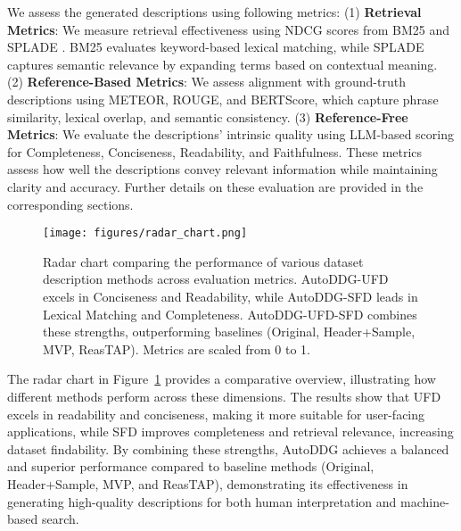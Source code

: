 % 
We assess the generated descriptions using following metrics:
% 
(1) \textbf{Retrieval Metrics}: We measure retrieval effectiveness using NDCG scores from BM25 \cite{robertson2009bm25} and SPLADE \cite{formal2021splade}. BM25 evaluates keyword-based lexical matching, while SPLADE captures semantic relevance by expanding terms based on contextual meaning.
% 
(2) \textbf{Reference-Based Metrics}: We assess alignment with ground-truth descriptions using METEOR, ROUGE, and BERTScore, which capture phrase similarity, lexical overlap, and semantic consistency.
% 
(3) \textbf{Reference-Free Metrics}: We evaluate the descriptions' intrinsic quality using LLM-based scoring for Completeness, Conciseness, Readability, and Faithfulness. These metrics assess how well the descriptions convey relevant information while maintaining clarity and accuracy.
% 
Further details on these evaluation are provided in the corresponding sections.

\begin{figure}[b]
  \centering
  \texttt{[image: figures/radar\_chart.png]}
  \vspace{-0.3cm}
  \caption{Radar chart comparing the performance of various dataset description methods across evaluation metrics. AutoDDG-UFD excels in Conciseness and Readability, while AutoDDG-SFD leads in Lexical Matching and Completeness. AutoDDG-UFD-SFD combines these strengths, outperforming baselines (Original, Header+Sample, MVP, ReasTAP). Metrics are scaled from 0 to 1.}
  \label{fig:summary_radar}
  \vspace{-0.3cm}
\end{figure}

% 
The radar chart in Figure~\ref{fig:summary_radar} provides a comparative overview, illustrating how different methods perform across these dimensions.
% 
The results show that UFD excels in readability and conciseness, making it more suitable for user-facing applications, while SFD improves completeness and retrieval relevance, increasing dataset findability. By combining these strengths, AutoDDG achieves a balanced and superior performance compared to baseline methods (Original, Header+Sample, MVP, and ReasTAP), demonstrating its effectiveness in generating high-quality descriptions for both human interpretation and machine-based search.
%



